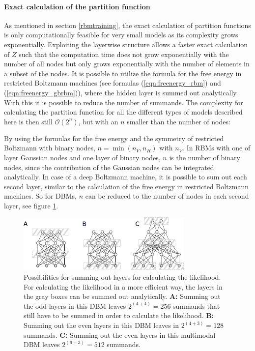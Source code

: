 \documentclass[12pt]{article}
\begin{document}
\paragraph{Exact calculation of the partition function}
\label{methodExactloglik}
As mentioned in section \ref{rbmtraining}, the exact calculation of partition functions is only computationally feasible for very small models as its complexity grows exponentially. Exploiting the layerwise structure allows a faster exact calculation of $Z$ such that the computation time does not grow exponentially with the number of all nodes but only grows exponentially with the number of elements in a subset of the nodes. It is possible to utilize the formula for the free energy in restricted Boltzmann machines (see formulas (\ref{eqn:freenergy_rbm}) and (\ref{eqn:freenergy_gbrbm})), where the hidden layer is summed out analytically.
With this it is possible to reduce the number of summands. 
The complexity for calculating the partition function for all the different types of  models described here is then still $\mathcal{O}(2^n)$, but with an $n$ smaller than the number of nodes:

By using the formulas for the free energy and the symmetry of restricted Boltzmann with binary nodes, $n = \min(n_V, n_H)$ with $n_V$.
In RBMs with one of layer Gaussian nodes and one layer of binary nodes, $n$ is the number of binary nodes, since the contribution of the Gaussian nodes can be integrated analytically.
In case of a deep Boltzmann machine, it is possible to sum out each second layer, similar to the calculation of the free energy in restricted Boltzmann machines. So for DBMs, $n$ can be reduced to the number of nodes in each second layer, see figure \ref{aissummingout}.

\begin{figure}[h!]
\centering
\includegraphics[scale=2.5]{images/AISsummingout.pdf}
\caption{Possibilities for summing out layers for calculating the likelihood. For calculating the likelihood in a more efficient way, the layers in the gray boxes can be summed out analytically. {\bf A:} Summing out the odd layers in this DBM leaves $2^{(4 + 4)} = 256$ summands that still have to be summed in order to calculate the likelihood. {\bf B:} Summing out the even layers in this DBM leaves in $2^{(4 + 3)} = 128$ summands. {\bf C:} Summing out the even layers in  this multimodal DBM leaves $2^{(6 + 3)} = 512$ summands.}
\label{aissummingout}
\end{figure}
\end{document}

